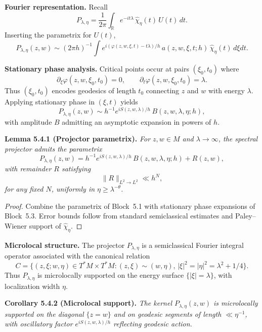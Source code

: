 \medskip

\noindent\textbf{Fourier representation.}
Recall
\[
  P_{\lambda,\eta} = \frac{1}{2\pi}\int_{\mathbb{R}} e^{-it\lambda}\,
  \widehat{\chi}_\eta(t)\, U(t)\, dt.
\]
Inserting the parametrix for $U(t)$,
\[
  P_{\lambda,\eta}(z,w) \sim (2\pi h)^{-1} \int e^{i(\varphi(z,w,\xi,t)-t\lambda)/h}\,
  a(z,w,\xi,t;h)\, \widehat{\chi}_\eta(t)\, d\xi dt.
\]

\medskip

\noindent\textbf{Stationary phase analysis.}
Critical points occur at pairs $(\xi_0,t_0)$ where
\[
  \partial_\xi \varphi(z,w,\xi_0,t_0)=0, \qquad \partial_t \varphi(z,w,\xi_0,t_0)=\lambda.
\]
Thus $(\xi_0,t_0)$ encodes geodesics of length $t_0$ connecting $z$ and $w$
with energy $\lambda$.
Applying stationary phase in $(\xi,t)$ yields
\[
  P_{\lambda,\eta}(z,w) \sim h^{-1} e^{i S(z,w,\lambda)/h}\, B(z,w,\lambda,\eta;h),
\]
with amplitude $B$ admitting an asymptotic expansion in powers of $h$.

\medskip

\noindent\textbf{Lemma 5.4.1 (Projector parametrix).}
\emph{For $z,w\in M$ and $\lambda\to\infty$, the spectral projector admits the parametrix}
\[
  P_{\lambda,\eta}(z,w) = h^{-1} e^{i S(z,w,\lambda)/h}\,
  B(z,w,\lambda,\eta;h) + R(z,w),
\]
\emph{with remainder $R$ satisfying}
\[
  \|R\|_{L^2\to L^2} \ll h^N,
\]
\emph{for any fixed $N$, uniformly in $\eta\ge \lambda^{-\theta}$.}

\begin{proof}
Combine the parametrix of Block~5.1 with stationary phase expansions of Block~5.3.
Error bounds follow from standard semiclassical estimates and Paley–Wiener support of $\widehat{\chi}_\eta$.
\end{proof}

\medskip

\noindent\textbf{Microlocal structure.}
The projector $P_{\lambda,\eta}$ is a semiclassical Fourier integral operator
associated with the canonical relation
\[
  C = \{ (z,\xi; w,\eta)\in T^*M\times T^*M : (z,\xi)\sim (w,\eta),\, |\xi|^2=|\eta|^2=\lambda^2+1/4 \}.
\]
Thus $P_{\lambda,\eta}$ is microlocally supported on the energy surface
$\{|\xi|=\lambda\}$, with localization width $\eta$.

\medskip

\noindent\textbf{Corollary 5.4.2 (Microlocal support).}
\emph{The kernel $P_{\lambda,\eta}(z,w)$ is microlocally supported on the diagonal
$\{z=w\}$ and on geodesic segments of length $\ll \eta^{-1}$,
with oscillatory factor $e^{iS(z,w,\lambda)/h}$ reflecting geodesic action.}

